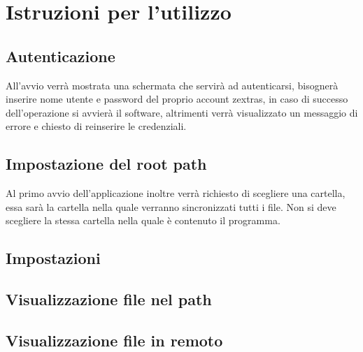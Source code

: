\section{Istruzioni per l'utilizzo}
\subsection{Autenticazione}

All'avvio verrà mostrata una schermata che servirà ad autenticarsi, bisognerà inserire nome utente e password del proprio account zextras, in caso di successo dell'operazione si avvierà il software, altrimenti verrà visualizzato un messaggio di errore e chiesto di reinserire le credenziali.

\subsection{Impostazione del root path}

Al primo avvio dell'applicazione inoltre verrà richiesto di scegliere una cartella, essa sarà la cartella nella quale verranno sincronizzati tutti i file. Non si deve scegliere la stessa cartella nella quale è contenuto il programma.

\subsection{Impostazioni}


\subsection{Visualizzazione file nel path}

\subsection{Visualizzazione file in remoto}